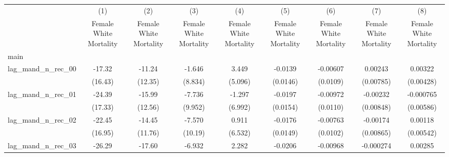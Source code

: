 {
\def\sym#1{\ifmmode^{#1}\else\(^{#1}\)\fi}
\begin{longtable}{l*{8}{c}}
\hline\hline\endfirsthead\hline\endhead\hline\endfoot\endlastfoot
                    &\multicolumn{1}{c}{(1)}&\multicolumn{1}{c}{(2)}&\multicolumn{1}{c}{(3)}&\multicolumn{1}{c}{(4)}&\multicolumn{1}{c}{(5)}&\multicolumn{1}{c}{(6)}&\multicolumn{1}{c}{(7)}&\multicolumn{1}{c}{(8)}\\
                    &\multicolumn{1}{c}{Female White Mortality}&\multicolumn{1}{c}{Female White Mortality}&\multicolumn{1}{c}{Female White Mortality}&\multicolumn{1}{c}{Female White Mortality}&\multicolumn{1}{c}{Female White Mortality}&\multicolumn{1}{c}{Female White Mortality}&\multicolumn{1}{c}{Female White Mortality}&\multicolumn{1}{c}{Female White Mortality}\\
\hline
main                &                     &                     &                     &                     &                     &                     &                     &                     \\
lag\_mand\_n\_rec\_00   &      -17.32         &      -11.24         &      -1.646         &       3.449         &     -0.0139         &    -0.00607         &     0.00243         &     0.00322         \\
                    &     (16.43)         &     (12.35)         &     (8.834)         &     (5.096)         &    (0.0146)         &    (0.0109)         &   (0.00785)         &   (0.00428)         \\
[1em]
lag\_mand\_n\_rec\_01   &      -24.39         &      -15.99         &      -7.736         &      -1.297         &     -0.0197         &    -0.00972         &    -0.00232         &   -0.000765         \\
                    &     (17.33)         &     (12.56)         &     (9.952)         &     (6.992)         &    (0.0154)         &    (0.0110)         &   (0.00848)         &   (0.00586)         \\
[1em]
lag\_mand\_n\_rec\_02   &      -22.45         &      -14.45         &      -7.570         &       0.911         &     -0.0176         &    -0.00763         &    -0.00174         &     0.00118         \\
                    &     (16.95)         &     (11.76)         &     (10.19)         &     (6.532)         &    (0.0149)         &    (0.0102)         &   (0.00865)         &   (0.00542)         \\
[1em]
lag\_mand\_n\_rec\_03   &      -26.29         &      -17.60         &      -6.932         &       2.282         &     -0.0206         &    -0.00968         &   -0.000274         &     0.00285         \\

\end{longtable}}
